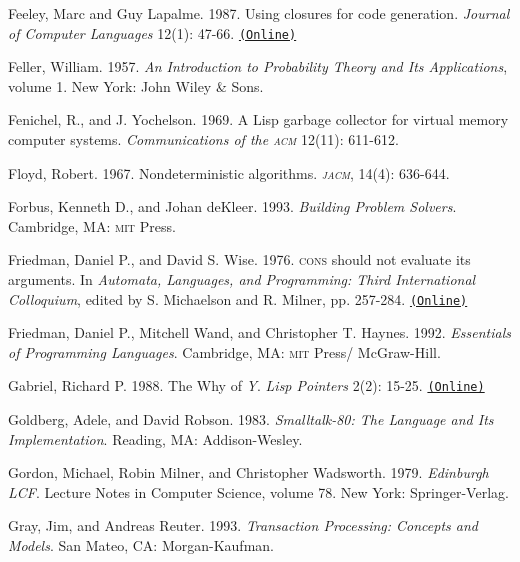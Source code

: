 \documentclass[oneside]{book}
\newcommand{\acronym}[1]{\textsc{\MakeLowercase{#1}}}
\newcommand{\code}[1]{\texttt{#1}}
\begin{document}
 \label{Feeley and Lapalme 1987}
Feeley, Marc and Guy Lapalme.  1987.  Using closures for code generation.
\textit{Journal of Computer Languages} 12(1): 47-66.
\href{http://citeseerx.ist.psu.edu/viewdoc/summary?doi=10.1.1.90.6978}{\code{(Online)}}

Feller, William.  1957.  \textit{An Introduction to Probability Theory and Its
Applications}, volume 1. New York: John Wiley \& Sons.

 \label{Fenichel and Yochelson (1969)}
Fenichel, R., and J. Yochelson.  1969.  A Lisp garbage collector for virtual
memory computer systems.  \textit{Communications of the \acronym{ACM}}
12(11): 611-612.

 \label{Floyd (1967)}
Floyd, Robert. 1967. Nondeterministic algorithms. \textit{\acronym{JACM}},
14(4): 636-644.

 \label{Forbus and deKleer 1993}
Forbus, Kenneth D., and Johan deKleer.  1993. \textit{Building Problem
Solvers}. Cambridge, MA: \acronym{MIT} Press.

 \label{Friedman and Wise (1976)}
Friedman, Daniel P., and David S. Wise.  1976.  \acronym{CONS} should not
evaluate its arguments. In \textit{Automata, Languages, and Programming: Third
International Colloquium}, edited by S. Michaelson and R.  Milner, pp. 257-284.
\href{https://www.cs.indiana.edu/cgi-bin/techreports/TRNNN.cgi?trnum=TR44}{\code{(Online)}}

 \label{Friedman et al. 1992}
Friedman, Daniel P., Mitchell Wand, and Christopher T. Haynes. 1992.
\textit{Essentials of Programming Languages}.  Cambridge, MA: \acronym{MIT}
Press/ McGraw-Hill.

 \label{Gabriel 1988}
Gabriel, Richard P. 1988.  The Why of \emph{Y}.  \textit{Lisp Pointers}
2(2): 15-25.
\href{http://www.dreamsongs.com/Files/WhyOfY.pdf}{\code{(Online)}}

Goldberg, Adele, and David Robson.  1983.  \textit{Smalltalk-80: The Language and
Its Implementation}. Reading, MA: Addison-Wesley.

 \label{Gordon et al. 1979}
Gordon, Michael, Robin Milner, and Christopher Wadsworth.  1979.
\textit{Edinburgh LCF}. Lecture Notes in Computer Science, volume 78. New York:
Springer-Verlag.

 \label{Gray and Reuter 1993}
Gray, Jim, and Andreas Reuter. 1993. \textit{Transaction Processing: Concepts and
Models}. San Mateo, CA: Morgan-Kaufman.
\end{document}
